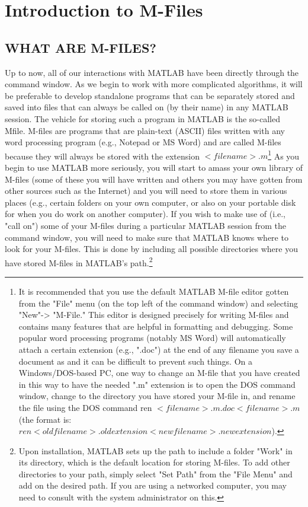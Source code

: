\documentclass[../main.tex]{subfiles}
\begin{document}
\chapter{Introduction to M-Files }

\section{WHAT ARE M-FILES?}

Up to now, all of our interactions with MATLAB have been directly through the command window. As we begin to work with more complicated algorithms, it will be preferable to develop standalone programs that can be separately stored and saved into files that can always be called on (by their name) in any MATLAB session. The vehicle for storing such a program in MATLAB is the so-called Mfile. M-files are programs that are plain-text (ASCII) files written with any word processing program (e.g., Notepad or MS Word) and are called M-files because they will always be stored with the extension $<filename>.m$\footnote{ It is recommended that you use the default MATLAB M-file editor gotten from the "File" menu (on 
the top left of the command window) and selecting "New"-> "M-File." This editor is designed 
precisely for writing M-files and contains many features that are helpful in formatting and debugging. 
Some popular word processing programs (notably MS Word) will automatically attach a certain 
extension (e.g., ".doc") at the end of any filename you save a document as and it can be difficult to 
prevent such things. On a Windows/DOS-based PC, one way to change an M-file that you have 
created in this way to have the needed ".m" extension is to open the DOS command window, change to 
the directory you have stored your M-file in, and rename the file using the DOS command ren 
$<filename>.m.doc <filename>.m$ (the format is: $ren <oldfilename>.oldextensio n <newfilename>.newextension$). } As you begin to use MATLAB more seriously, you will start to amass your own library of M-files (some of these you will have written and others you may have gotten from other sources such as the Internet) and you will need to store them in various places (e.g., certain folders on your own computer, or also on your portable disk for when you do work on another computer). If you wish to make use of (i.e., "call on") some of your M-files during a particular MATLAB session from the command window, you will need to make sure that MATLAB knows where to look for your M-files. This is done by including all possible directories where you have stored M-files in MATLAB's path.\footnote{Upon installation, MATLAB sets up the path to include a folder "Work" in its directory, which is the 
default location for storing M-files. To add other directories to your path, simply select "Set Path" 
from the "File Menu" and add on the desired path. If you are using a networked computer, you may 
need to consult with the system administrator on this. }
\end{document}
